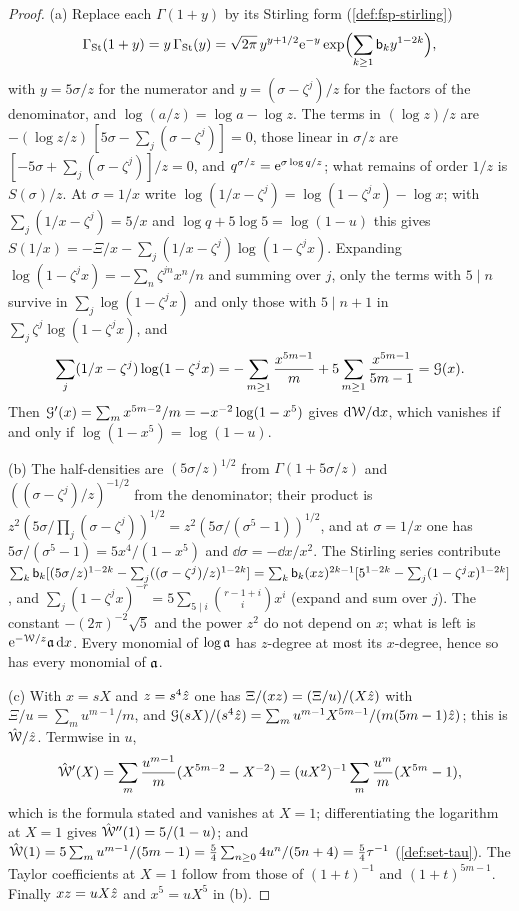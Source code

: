 
\begin{proof}
(a) Replace each $\Gamma(1+y)$ by its Stirling form (\cref{def:fsp-stirling})
\[
\Gamma_{\mathrm{St}}(1+y)=y\,\Gamma_{\mathrm{St}}(y)=\sqrt{2\pi}\,y^{y+1/2}\mathrm{e}^{-y}\exp\Bigl(\sum_{k\geq1}\mathsf{b}_ky^{1-2k}\Bigr),
\]
with $y=5\sigma/z$ for the numerator and $y=(\sigma-\zeta^j)/z$ for the factors of the denominator, and $\log(a/z)=\log a-\log z$. The terms in $(\log z)/z$ are $-(\log z/z)\,[5\sigma-\sum_j(\sigma-\zeta^j)]=0$, those linear in $\sigma/z$ are $[-5\sigma+\sum_j(\sigma-\zeta^j)]/z=0$, and $q^{\sigma/z}=\mathrm{e}^{\sigma\log q/z}$; what remains of order $1/z$ is $S(\sigma)/z$. At $\sigma=1/x$ write $\log(1/x-\zeta^j)=\log(1-\zeta^jx)-\log x$; with $\sum_j(1/x-\zeta^j)=5/x$ and $\log q+5\log5=\log(1-u)$ this gives $S(1/x)=-\Xi/x-\sum_j(1/x-\zeta^j)\log(1-\zeta^jx)$. Expanding $\log(1-\zeta^jx)=-\sum_n\zeta^{jn}x^n/n$ and summing over $j$, only the terms with $5\mid n$ survive in $\sum_j\log(1-\zeta^jx)$ and only those with $5\mid n+1$ in $\sum_j\zeta^j\log(1-\zeta^jx)$, and
\[
\sum_j(1/x-\zeta^j)\log(1-\zeta^jx)=-\sum_{m\geq1}\frac{x^{5m-1}}m+5\sum_{m\geq1}\frac{x^{5m-1}}{5m-1}=\mathcal{G}(x).
\]
Then $\mathcal{G}'(x)=\sum_mx^{5m-2}/m=-x^{-2}\log(1-x^5)$ gives $\mathrm{d}\mathcal{W}/\mathrm{d} x$, which vanishes if and only if $\log(1-x^5)=\log(1-u)$.

(b) The half-densities are $(5\sigma/z)^{1/2}$ from $\Gamma(1+5\sigma/z)$ and $((\sigma-\zeta^j)/z)^{-1/2}$ from the denominator; their product is $z^2(5\sigma/\prod_j(\sigma-\zeta^j))^{1/2}=z^2(5\sigma/(\sigma^5-1))^{1/2}$, and at $\sigma=1/x$ one has $5\sigma/(\sigma^5-1)=5x^4/(1-x^5)$ and $\dd\sigma=-\dd x/x^2$. The Stirling series contribute $\sum_k\mathsf{b}_k[(5\sigma/z)^{1-2k}-\sum_j((\sigma-\zeta^j)/z)^{1-2k}]=\sum_k\mathsf{b}_k(xz)^{2k-1}[5^{1-2k}-\sum_j(1-\zeta^jx)^{1-2k}]$, and $\sum_j(1-\zeta^jx)^{-r}=5\sum_{5\mid i}\binom{r-1+i}{i}x^i$ (expand and sum over $j$). The constant $-(2\pi)^{-2}\sqrt5$ and the power $z^2$ do not depend on $x$; what is left is $\mathrm{e}^{-\mathcal{W}/z}\mathfrak{a}\,\mathrm{d} x$. Every monomial of $\log\mathfrak{a}$ has $z$-degree at most its $x$-degree, hence so has every monomial of $\mathfrak{a}$.

(c) With $x=sX$ and $z=s^4\hat{z}$ one has $\Xi/(xz)=(\Xi/u)/(X\hat{z})$ with $\Xi/u=\sum_mu^{m-1}/m$, and $\mathcal{G}(sX)/(s^4\hat{z})=\sum_mu^{m-1}X^{5m-1}/(m(5m-1)\hat{z})$; this is $\hat{\mathcal{W}}/\hat{z}$. Termwise in $u$,
\[
\hat{\mathcal{W}}'(X)=\sum_m\frac{u^{m-1}}m(X^{5m-2}-X^{-2})=(uX^2)^{-1}\sum_m\frac{u^m}m(X^{5m}-1),
\]
which is the formula stated and vanishes at $X=1$; differentiating the logarithm at $X=1$ gives $\hat{\mathcal{W}}''(1)=5/(1-u)$; and $\hat{\mathcal{W}}(1)=5\sum_mu^{m-1}/(5m-1)=\frac54\sum_{n\geq0}4u^n/(5n+4)=\frac54\tau^{-1}$ (\cref{def:set-tau}). The Taylor coefficients at $X=1$ follow from those of $(1+t)^{-1}$ and $(1+t)^{5m-1}$. Finally $xz=uX\hat{z}$ and $x^5=uX^5$ in (b).


\end{proof}
